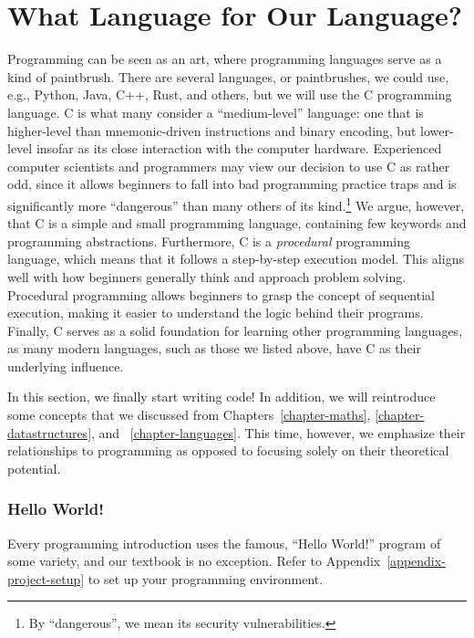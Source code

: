 \section*{What Language for Our Language?}

Programming can be seen as an art, where programming languages serve as a kind of paintbrush. There are several languages, or paintbrushes, we could use, e.g., Python, Java, C++, Rust, and others, but we will use the C programming language. C is what many consider a ``medium-level'' language: one that is higher-level than mnemonic-driven instructions and binary encoding, but lower-level insofar as its close interaction with the computer hardware. Experienced computer scientists and programmers may view our decision to use C as rather odd, since it allows beginners to fall into bad programming practice traps and is significantly more ``dangerous'' than many others of its kind.\footnote{By ``dangerous'', we mean its security vulnerabilities.} We argue, however, that C is a simple and small programming language, containing few keywords and programming abstractions. Furthermore, C is a \textit{procedural} programming language, which means that it follows a step-by-step execution model. This aligns well with how beginners generally think and approach problem solving. Procedural programming allows beginners to grasp the concept of sequential execution, making it easier to understand the logic behind their programs. Finally, C serves as a solid foundation for learning other programming languages, as many modern languages, such as those we listed above, have C as their underlying influence.

In this section, we finally start writing code! In addition, we will reintroduce some concepts that we discussed from Chapters~\ref{chapter-maths}, \ref{chapter-datastructures}, and ~\ref{chapter-languages}. This time, however, we emphasize their relationships to programming as opposed to focusing solely on their theoretical potential.

\subsubsection*{Hello World!}

Every programming introduction uses the famous, ``Hello World!'' program of some variety, and our textbook is no exception. Refer to Appendix~\ref{appendix-project-setup} to set up your programming environment.

